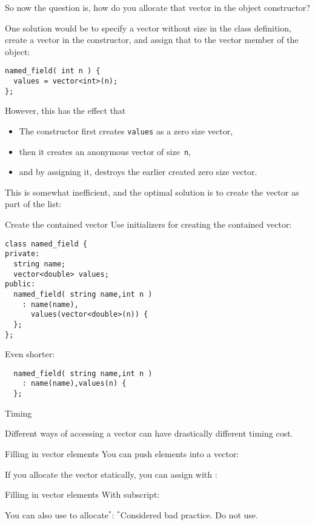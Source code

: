 So now the question is, how do you allocate that vector
in the object constructor?

One solution would be to specify a vector without size in the class
definition, create a vector in the constructor, and assign that
to the vector member of the object:
\begin{lstlisting}
named_field( int n ) {
  values = vector<int>(n);
};
\end{lstlisting}
However, this has the effect that
\begin{itemize}
\item The constructor first creates \lstinline{values} as a zero size vector,
\item then it creates an anonymous vector of size~\lstinline{n},
\item and by assigning it, destroys the earlier created zero size vector.
\end{itemize}
This is somewhat inefficient, and the optimal solution is
to create the vector as part of the
 list:

\begin{block}{Create the contained vector}
  \label{sl:class-has-vector}
  Use initializers for creating the contained vector:
  \lstset{style=snippetcode}
\begin{lstlisting}
class named_field {
private:
  string name;
  vector<double> values;
public:
  named_field( string name,int n )
    : name(name),
      values(vector<double>(n)) {
  };
};
\end{lstlisting}

Even shorter:
\begin{lstlisting}
  named_field( string name,int n ) 
    : name(name),values(n) {
  };
\end{lstlisting}
\end{block}

 {Timing}

Different ways of accessing a vector can have drastically different
timing cost.

\begin{block}{Filling in vector elements}
  \label{sl:vect-extend-code}
  You can push elements into a vector:

  If you allocate the vector statically, you can assign with :
\end{block}

\begin{block}{Filling in vector elements}
  \label{sl:vect-extend-code2}
  With subscript:

  You can also use  to allocate$^*$:
  $^*$Considered bad practice. Do not use.
\end{block}

